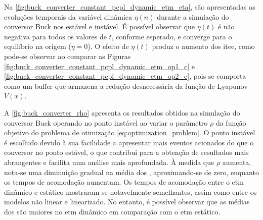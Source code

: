 Na \autoref{fig:buck_converter_constant_pcpl_dynamic_etm_eta}, são apresentadas as evoluções temporais da variável dinâmica $\eta(n)$ durante a simulação do conversor Buck nos  estável e instável. É possível observar que $\eta(t)$ é não negativa para todos os valores de $t$, conforme esperado, e converge para o equilíbrio na origem ($\eta = 0$). O efeito de $\eta(t)$ produz o aumento dos \acrshort{itee}, como pode-se observar ao comparar as Figuras \ref{fig:buck_converter_constant_pcpl_dynamic_etm_op1_c} e \ref{fig:buck_converter_constant_pcpl_dynamic_etm_op2_c}, pois se comporta como um buffer que armazena a redução desnecessária da função de Lyapunov $V(x)$.


A \autoref{fig:buck_converter_rho} apresenta os resultados obtidos na simulação do conversor Buck operando no ponto instável ao variar o parâmetro $\rho$ da função objetivo do problema de otimização \eqref{eq:optimization_problem}. O ponto instável é escolhido devido à sua facilidade a apresentar mais eventos acionados do que o conversor no ponto estável, o que contribui para a obtenção de resultados mais abrangentes e facilita uma análise mais aprofundada. À medida que $\rho$ aumenta, nota-se uma diminuição gradual na média dos , aproximando-se de zero, enquanto os tempos de acomodação aumentam. Os tempos de acomodação entre o \acrshort{etm} dinâmico e estático mostraram-se notavelmente semelhantes, assim como entre os modelos não linear e linearizado. No entanto, é possível observar que as médias dos  são maiores no \acrshort{etm} dinâmico em comparação com o \acrshort{etm} estático.

